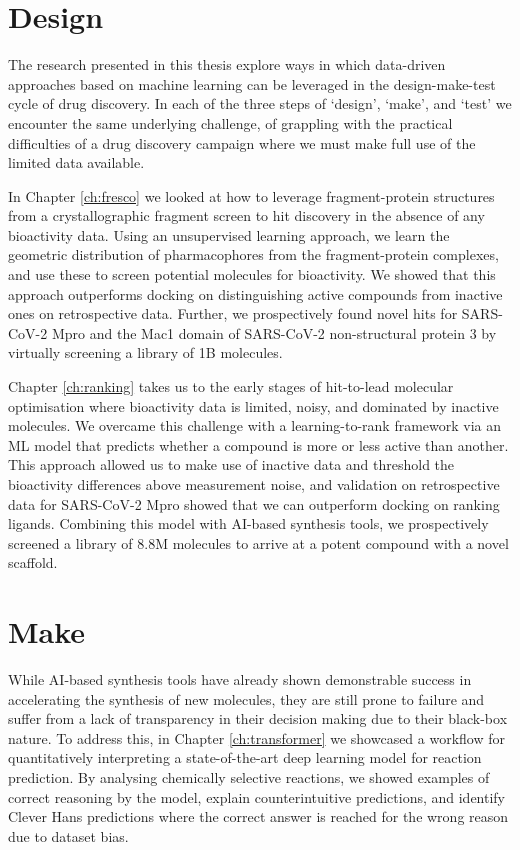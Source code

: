 \section*{Design}
The research presented in this thesis explore ways in which data-driven approaches based on machine learning can be leveraged in the design-make-test cycle of drug discovery. In each of the three steps of `design', `make', and `test' we encounter the same underlying challenge, of grappling with the practical difficulties of a drug discovery campaign where we must make full use of the limited data available.

In Chapter \ref{ch:fresco} we looked at how to leverage fragment-protein structures from a crystallographic fragment screen to hit discovery in the absence of any bioactivity data. Using an unsupervised learning approach, we learn the geometric distribution of pharmacophores from the fragment-protein complexes, and use these to screen potential molecules for bioactivity. We showed that this approach outperforms docking on distinguishing active compounds from inactive ones on retrospective data. Further, we prospectively found novel hits for SARS-CoV-2 Mpro and the Mac1 domain of SARS-CoV-2 non-structural protein 3 by virtually screening a library of 1B molecules.

Chapter \ref{ch:ranking} takes us to the early stages of hit-to-lead molecular optimisation where bioactivity data is limited, noisy, and dominated by inactive molecules. We overcame this challenge with a learning-to-rank framework via an ML model that predicts whether a compound is more or less active than another. This approach allowed us to make use of inactive data and threshold the bioactivity differences above measurement noise, and validation on retrospective data for SARS-CoV-2 Mpro showed that we can outperform docking on ranking ligands. Combining this model with AI-based synthesis tools, we prospectively screened a library of 8.8M molecules to arrive at a potent compound with a novel scaffold.

\section*{Make}
While AI-based synthesis tools have already shown demonstrable success in accelerating the synthesis of new molecules, they are still prone to failure and suffer from a lack of transparency in their decision making due to their black-box nature. To address this, in Chapter \ref{ch:transformer} we showcased a workflow for quantitatively interpreting a state-of-the-art deep learning model for reaction prediction. By analysing chemically selective reactions, we showed examples of correct reasoning by the model, explain counterintuitive predictions, and identify Clever Hans predictions where the correct answer is reached for the wrong reason due to dataset bias.

